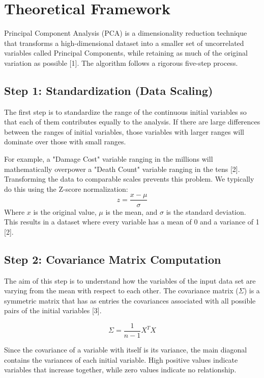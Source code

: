 \documentclass[12pt, a4paper]{report}
\begin{document}
\section{Theoretical Framework}
Principal Component Analysis (PCA) is a dimensionality reduction technique that transforms a high-dimensional dataset into a smaller set of uncorrelated variables called Principal Components, while retaining as much of the original variation as possible [1]. The algorithm follows a rigorous five-step process.

\subsection{Step 1: Standardization (Data Scaling)}
The first step is to standardize the range of the continuous initial variables so that each of them contributes equally to the analysis. If there are large differences between the ranges of initial variables, those variables with larger ranges will dominate over those with small ranges.

For example, a "Damage Cost" variable ranging in the millions will mathematically overpower a "Death Count" variable ranging in the tens [2]. Transforming the data to comparable scales prevents this problem. We typically do this using the Z-score normalization:
\begin{equation}
    z = \frac{x - \mu}{\sigma}
\end{equation}
Where $x$ is the original value, $\mu$ is the mean, and $\sigma$ is the standard deviation. This results in a dataset where every variable has a mean of 0 and a variance of 1 [2].

\subsection{Step 2: Covariance Matrix Computation}
The aim of this step is to understand how the variables of the input data set are varying from the mean with respect to each other. The covariance matrix ($\Sigma$) is a symmetric matrix that has as entries the covariances associated with all possible pairs of the initial variables [3].

\begin{equation}
    \Sigma = \frac{1}{n-1} X^T X
\end{equation}

Since the covariance of a variable with itself is its variance, the main diagonal contains the variances of each initial variable. High positive values indicate variables that increase together, while zero values indicate no relationship.
\end{document}
